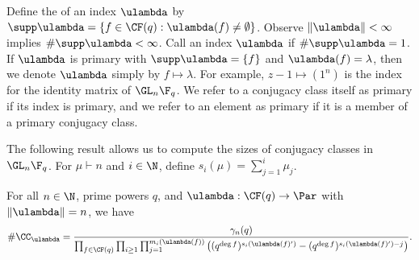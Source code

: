 Define the  of an index $\ulambda$ by $\supp \ulambda = \{f \in \CF (q) : \ulambda (f) \neq \emptyset\}$. Observe $\| \ulambda \| < \infty$ implies $\# \supp \ulambda  < \infty$. Call an index $\ulambda$  if $\# \supp \ulambda = 1$.
If $\ulambda$ is primary with $\supp \ulambda = \{f\}$ and $\ulambda (f) = \lambda$, then we denote $\ulambda$ simply by $f \mapsto \lambda$. For example, $z-1 \mapsto (1^n)$ is the index for the identity matrix of $\GL_n \F_q$.
We refer to a conjugacy class itself as primary if its index is primary, and we refer to an element as primary if it is a member of a primary conjugacy class.

The following result allows us to compute the sizes of conjugacy classes in \(\GL_n \F_q\).
For \(\mu \vdash n\) and \(i \in \N\), define \(s_i(\mu) = \sum_{j=1}^i \mu_j\).

\begin{theorem}[{\cite[Theorem~1.10.7]{EC1}}]
\label{cc_sizes}
For all \(n \in \N\), prime powers \(q\), and \(\ulambda : \CF (q) \to \Par\) with \(\|\ulambda \| = n\), we have
\begin{equation}
\# \CC_\ulambda
=
\frac{\gamma_n(q)}{
\prod_{f \in \CF (q)}
\prod_{i \geq 1}
\prod_{j = 1}^{m_i(\ulambda(f))}
\left (
(q^{\deg f})^{s_i(\ulambda(f)')}
-
(q^{\deg f})^{s_i(\ulambda(f)') - j}
\right ) }.
\end{equation}
\end{theorem}





